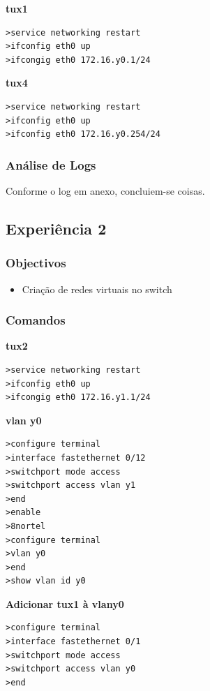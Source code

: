 \documentclass[a4paper,11pt]{article}
\begin{document}
\textbf{tux1}
\lstset{showstringspaces=false,
		caption=,
		frame=tb}
		
\begin{lstlisting}
>service networking restart
>ifconfig eth0 up
>ifcongig eth0 172.16.y0.1/24
\end{lstlisting}

\textbf{tux4}

\begin{lstlisting}
>service networking restart
>ifconfig eth0 up
>ifconfig eth0 172.16.y0.254/24
\end{lstlisting}


\subsubsection{Análise de Logs}
Conforme o log em anexo, concluiem-se coisas.

\subsection{Experiência 2}
\subsubsection{Objectivos}

\begin{itemize}
\item Criação de redes virtuais no switch
\end{itemize}

\subsubsection{Comandos}
\textbf{tux2}

\begin{lstlisting}
>service networking restart
>ifconfig eth0 up
>ifcongig eth0 172.16.y1.1/24
\end{lstlisting}

\textbf{vlan y0}

\begin{lstlisting}
>configure terminal
>interface fastethernet 0/12
>switchport mode access
>switchport access vlan y1
>end
>enable
>8nortel
>configure terminal
>vlan y0
>end
>show vlan id y0
\end{lstlisting}

\textbf{Adicionar tux1 à vlany0}

\begin{lstlisting}
>configure terminal
>interface fastethernet 0/1
>switchport mode access
>switchport access vlan y0
>end
\end{lstlisting}
\end{document}
